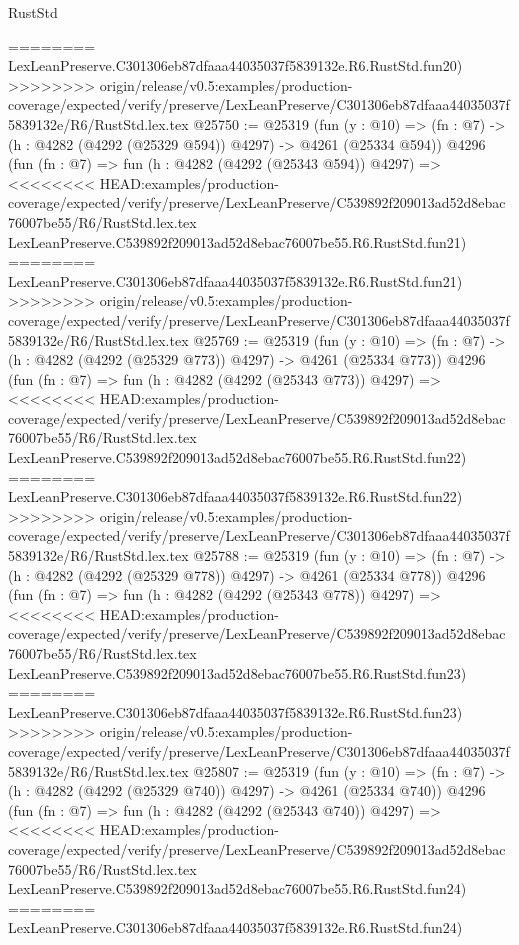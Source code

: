 \begin{lexlean}{RustStd}
\begin{coremodule}
{\begin{coremodule}
{{{{{{{{{{{{{{{{{{{{{{{{{{{{{{{{{{{========
    LexLeanPreserve.C301306eb87dfaaa44035037f5839132e.R6.RustStd.fun20)
>>>>>>>> origin/release/v0.5:examples/production-coverage/expected/verify/preserve/LexLeanPreserve/C301306eb87dfaaa44035037f5839132e/R6/RustStd.lex.tex
@25750 := @25319
    (fun (y : @10) => (fn : @7) -> (h : @4282 (@4292 (@25329 @594)) @4297) -> @4261 (@25334 @594))
    @4296
    (fun (fn : @7) =>
    fun (h : @4282 (@4292 (@25343 @594)) @4297) =>
<<<<<<<< HEAD:examples/production-coverage/expected/verify/preserve/LexLeanPreserve/C539892f209013ad52d8ebac76007be55/R6/RustStd.lex.tex
    LexLeanPreserve.C539892f209013ad52d8ebac76007be55.R6.RustStd.fun21)
========
    LexLeanPreserve.C301306eb87dfaaa44035037f5839132e.R6.RustStd.fun21)
>>>>>>>> origin/release/v0.5:examples/production-coverage/expected/verify/preserve/LexLeanPreserve/C301306eb87dfaaa44035037f5839132e/R6/RustStd.lex.tex
@25769 := @25319
    (fun (y : @10) => (fn : @7) -> (h : @4282 (@4292 (@25329 @773)) @4297) -> @4261 (@25334 @773))
    @4296
    (fun (fn : @7) =>
    fun (h : @4282 (@4292 (@25343 @773)) @4297) =>
<<<<<<<< HEAD:examples/production-coverage/expected/verify/preserve/LexLeanPreserve/C539892f209013ad52d8ebac76007be55/R6/RustStd.lex.tex
    LexLeanPreserve.C539892f209013ad52d8ebac76007be55.R6.RustStd.fun22)
========
    LexLeanPreserve.C301306eb87dfaaa44035037f5839132e.R6.RustStd.fun22)
>>>>>>>> origin/release/v0.5:examples/production-coverage/expected/verify/preserve/LexLeanPreserve/C301306eb87dfaaa44035037f5839132e/R6/RustStd.lex.tex
@25788 := @25319
    (fun (y : @10) => (fn : @7) -> (h : @4282 (@4292 (@25329 @778)) @4297) -> @4261 (@25334 @778))
    @4296
    (fun (fn : @7) =>
    fun (h : @4282 (@4292 (@25343 @778)) @4297) =>
<<<<<<<< HEAD:examples/production-coverage/expected/verify/preserve/LexLeanPreserve/C539892f209013ad52d8ebac76007be55/R6/RustStd.lex.tex
    LexLeanPreserve.C539892f209013ad52d8ebac76007be55.R6.RustStd.fun23)
========
    LexLeanPreserve.C301306eb87dfaaa44035037f5839132e.R6.RustStd.fun23)
>>>>>>>> origin/release/v0.5:examples/production-coverage/expected/verify/preserve/LexLeanPreserve/C301306eb87dfaaa44035037f5839132e/R6/RustStd.lex.tex
@25807 := @25319
    (fun (y : @10) => (fn : @7) -> (h : @4282 (@4292 (@25329 @740)) @4297) -> @4261 (@25334 @740))
    @4296
    (fun (fn : @7) =>
    fun (h : @4282 (@4292 (@25343 @740)) @4297) =>
<<<<<<<< HEAD:examples/production-coverage/expected/verify/preserve/LexLeanPreserve/C539892f209013ad52d8ebac76007be55/R6/RustStd.lex.tex
    LexLeanPreserve.C539892f209013ad52d8ebac76007be55.R6.RustStd.fun24)
========
    LexLeanPreserve.C301306eb87dfaaa44035037f5839132e.R6.RustStd.fun24)
}}}}}}}}}}}}}}}}}}}}}}}}}}}}}}}}}}}
\end{coremodule}}
\end{coremodule}
\end{lexlean}
